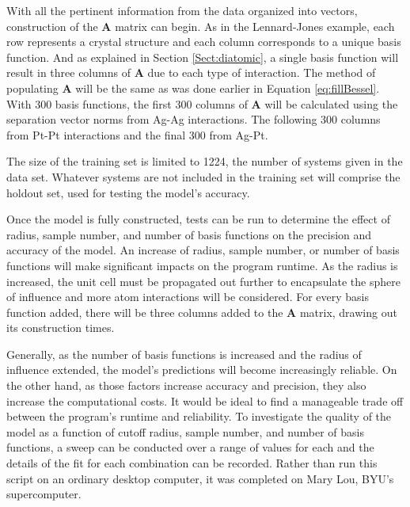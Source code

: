With all the pertinent information from the data organized into vectors, construction of the $\mathbf{A}$ matrix can begin. As in the Lennard-Jones example, each row represents a crystal structure and each column corresponds to a unique basis function. And as explained in Section \ref{Sect:diatomic}, a single basis function will result in three columns of $\mathbf{A}$ due to each type of interaction. The method of populating $\mathbf{A}$ will be the same as was done earlier in Equation \ref{eq:fillBessel}. With 300 basis functions, the first 300 columns of $\mathbf{A}$ will be calculated using the separation vector norms from Ag-Ag interactions. The following 300 columns from Pt-Pt interactions and the final 300 from Ag-Pt.
\par The size of the training set is limited to 1224, the number of systems given in the data set. Whatever systems are not included in the training set will comprise the holdout set, used for testing the model's accuracy.
\par Once the model is fully constructed, tests can be run to determine the effect of radius, sample number, and number of basis functions on the precision and accuracy of the model. An increase of radius, sample number, or number of basis functions will make significant impacts on the program runtime. As the radius is increased, the unit cell must be propagated out further to encapsulate the sphere of influence and more atom interactions will be considered. For every basis function added, there will be three columns added to the $\mathbf{A}$ matrix, drawing out its construction times. 
\par Generally, as the number of basis functions is increased and the radius of influence extended, the model's predictions will become increasingly reliable. On the other hand, as those factors increase accuracy and precision, they also increase the computational costs. It would be ideal to find a manageable trade off between the program's runtime and reliability. To investigate the quality of the model as a function of cutoff radius, sample number, and number of basis functions, a sweep can be conducted over a range of values for each and the details of the fit for each combination can be recorded. Rather than run this script on an ordinary desktop computer, it was completed on Mary Lou, BYU's supercomputer. 


